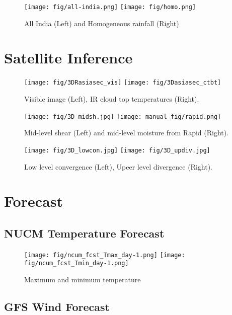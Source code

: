\documentclass[10pt,usletter]{article} %
\begin{document}
\begin{figure}[H]
\centering
\texttt{[image: fig/all-india.png]}
\texttt{[image: fig/homo.png]}
\caption{All India  (Left) and Homogeneous rainfall (Right)}
\end{figure}



\section{Satellite Inference}
\begin{figure}[H]
\centering
\texttt{[image: fig/3DRasiasec\_vis]}
\texttt{[image: fig/3Dasiasec\_ctbt]}\\
\caption{Visible image (Left), IR cloud top temperatures (Right).}
\end{figure}

\begin{figure}[H]
\centering
\texttt{[image: fig/3D\_midsh.jpg]}
\texttt{[image: manual\_fig/rapid.png]}
\caption{Mid-level shear (Left) and mid-level moisture from Rapid (Right).}
\end{figure}


\begin{figure}[H]
\centering
\texttt{[image: fig/3D\_lowcon.jpg]}
\texttt{[image: fig/3D\_updiv.jpg]}

\caption{Low level convergence (Left), Upeer level divergence  (Right).}
\end{figure}

\section{Forecast}

\subsection*{NUCM Temperature Forecast}
\begin{figure}[H]
\centering
\texttt{[image: fig/ncum\_fcst\_Tmax\_day-1.png]}
\texttt{[image: fig/ncum\_fcst\_Tmin\_day-1.png]}
\caption{Maximum and minimum temperature}
\end{figure}


\subsection*{GFS Wind Forecast}
\end{document}
